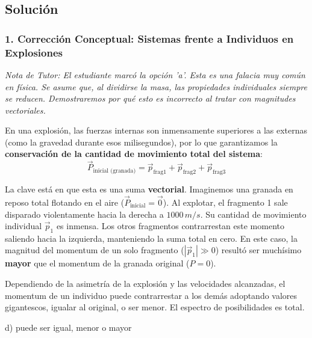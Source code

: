 \documentclass[12pt, a4paper]{article}
\begin{document}
\subsection*{Solución}

\subsubsection*{1. Corrección Conceptual: Sistemas frente a Individuos en Explosiones}
\textit{Nota de Tutor: El estudiante marcó la opción 'a'. Esta es una falacia muy común en física. Se asume que, al dividirse la masa, las propiedades individuales siempre se reducen. Demostraremos por qué esto es incorrecto al tratar con magnitudes vectoriales.}

En una explosión, las fuerzas internas son inmensamente superiores a las externas (como la gravedad durante esos milisegundos), por lo que garantizamos la \textbf{conservación de la cantidad de movimiento total del sistema}:
$$ \vec{P}_{\text{inicial (granada)}} = \vec{p}_{\text{frag1}} + \vec{p}_{\text{frag2}} + \vec{p}_{\text{frag3}} $$

La clave está en que esta es una suma \textbf{vectorial}. 
Imaginemos una granada en reposo total flotando en el aire ($\vec{P}_{\text{inicial}} = \vec{0}$). Al explotar, el fragmento 1 sale disparado violentamente hacia la derecha a $1000\,\si{m/s}$. Su cantidad de movimiento individual $\vec{p}_1$ es inmensa. Los otros fragmentos contrarrestan este momento saliendo hacia la izquierda, manteniendo la suma total en cero.
En este caso, la magnitud del momentum de un solo fragmento ($|\vec{p}_1| \gg 0$) resultó ser muchísimo \textbf{mayor} que el momentum de la granada original ($P = 0$).

Dependiendo de la asimetría de la explosión y las velocidades alcanzadas, el momentum de un individuo puede contrarrestar a los demás adoptando valores gigantescos, igualar al original, o ser menor. El espectro de posibilidades es total.

\begin{tcolorbox}[colback=green!5!white, colframe=green!50!black, title=Respuesta Final]
\centering \Large d) puede ser igual, menor o mayor
\end{tcolorbox}

\newpage
\end{document}
